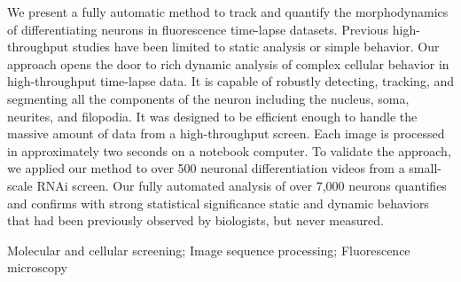 
We present a fully automatic method to track and
quantify the morphodynamics of differentiating
neurons in fluorescence time-lapse datasets.
Previous high-throughput studies have been limited
to static analysis or simple behavior. Our
approach opens the door to rich dynamic analysis
of complex cellular behavior in high-throughput
time-lapse data. It is capable of robustly
detecting, tracking, and segmenting all the
components of the neuron including the nucleus,
soma, neurites, and filopodia. It was designed to
be efficient enough to handle the massive amount
of data from a high-throughput screen. Each image
is processed in approximately two seconds on a
notebook computer. To validate the approach, we
applied our method to over 500 neuronal
differentiation videos from a small-scale RNAi
screen. Our fully automated analysis of over 7,000
neurons quantifies and confirms with strong
statistical significance static and dynamic
behaviors that had been previously observed by
biologists, but never measured.



\begin{keywords}
Molecular and cellular screening; Image sequence processing; Fluorescence microscopy
\end{keywords}







